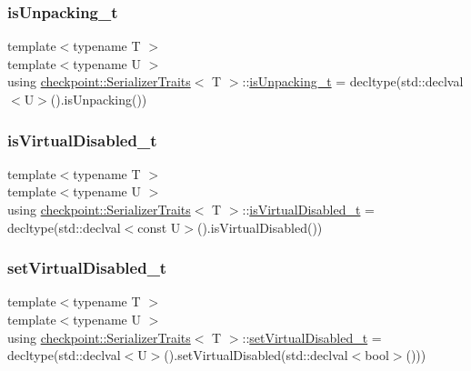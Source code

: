 \subsubsection{\texorpdfstring{is\+Unpacking\+\_\+t}{isUnpacking\_t}}
{\footnotesize\ttfamily template$<$typename T $>$ \\
template$<$typename U $>$ \\
using \hyperlink{structcheckpoint_1_1_serializer_traits}{checkpoint\+::\+Serializer\+Traits}$<$ T $>$\+::\hyperlink{structcheckpoint_1_1_serializer_traits_abc375c9fd74b102d51a74af8884c72e0}{is\+Unpacking\+\_\+t} =  decltype(std\+::declval$<$U$>$().is\+Unpacking())}

\mbox{\label{structcheckpoint_1_1_serializer_traits_ad78a62a4399d95f2085684fc09c12196}} 
\subsubsection{\texorpdfstring{is\+Virtual\+Disabled\+\_\+t}{isVirtualDisabled\_t}}
{\footnotesize\ttfamily template$<$typename T $>$ \\
template$<$typename U $>$ \\
using \hyperlink{structcheckpoint_1_1_serializer_traits}{checkpoint\+::\+Serializer\+Traits}$<$ T $>$\+::\hyperlink{structcheckpoint_1_1_serializer_traits_ad78a62a4399d95f2085684fc09c12196}{is\+Virtual\+Disabled\+\_\+t} =  decltype(std\+::declval$<$const U$>$().is\+Virtual\+Disabled())}

\mbox{\label{structcheckpoint_1_1_serializer_traits_ac8e1715e588932dc8e4dc14130b6ca9e}} 
\subsubsection{\texorpdfstring{set\+Virtual\+Disabled\+\_\+t}{setVirtualDisabled\_t}}
{\footnotesize\ttfamily template$<$typename T $>$ \\
template$<$typename U $>$ \\
using \hyperlink{structcheckpoint_1_1_serializer_traits}{checkpoint\+::\+Serializer\+Traits}$<$ T $>$\+::\hyperlink{structcheckpoint_1_1_serializer_traits_ac8e1715e588932dc8e4dc14130b6ca9e}{set\+Virtual\+Disabled\+\_\+t} =  decltype(std\+::declval$<$U$>$().set\+Virtual\+Disabled(std\+::declval$<$bool$>$()))}



